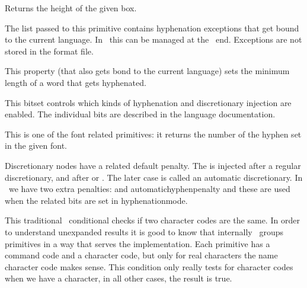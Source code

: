 Returns the height of the given box.

\stopoldprimitive

\startoldprimitive[title={\prm {hyphenation}}]

The list passed to this primitive contains hyphenation exceptions that get bound
to the current language. In \LUAMETATEX\ this can be managed at the \LUA\ end.
Exceptions are not stored in the format file.

\stopoldprimitive

\startnewprimitive[title={\prm {hyphenationmin}}]

This property (that also gets bond to the current language) sets the minimum
length of a word that gets hyphenated.

\stopnewprimitive

\startnewprimitive[title={\prm {hyphenationmode}}]

This bitset controls which kinds of hyphenation and discretionary injection are
enabled. The individual bits are described in the language documentation.

\stopnewprimitive

\startoldprimitive[title={\prm {hyphenchar}}]

This is one of the font related primitives: it returns the number of the hyphen
set in the given font.

\stopoldprimitive

\startoldprimitive[title={\prm {hyphenpenalty}}]

Discretionary nodes have a related default penalty. The  is
injected after a regular discretionary, and  after \type
{\-} or \type {-}. The later case is called an automatic discretionary. In
\LUAMETATEX\ we have two extra penalties:  and \prm
{automatichyphenpenalty} and these are used when the related bits are set in \prm
{hyphenationmode}.

\stopoldprimitive

\startoldprimitive[title={\prm {if}}]

This traditional \TEX\ conditional checks if two character codes are the same. In
order to understand unexpanded results it is good to know that internally \TEX\
groups primitives in a way that serves the implementation. Each primitive has a
command code and a character code, but only for real characters the name
character code makes sense. This condition only really tests for character codes
when we have a character, in all other cases, the result is true.

